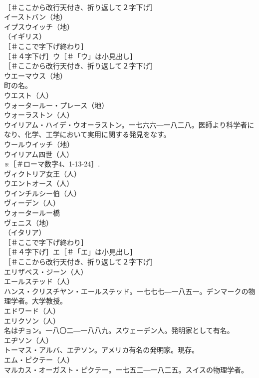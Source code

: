 \documentclass[8pt]{extreport}
\begin{document}
\begin{CJK}{UTF8}{min}
\\	［＃ここから改行天付き、折り返して２字下げ］
\\	イーストバン（地）
\\	イプスウイッチ（地）
\\	（イギリス）
\\	［＃ここで字下げ終わり］
\\	［＃４字下げ］ウ［＃「ウ」は小見出し］
\\	［＃ここから改行天付き、折り返して２字下げ］
\\	ウエーマウス（地）
\\	町の名。
\\	ウエスト（人）
\\	ウォータールー・プレース（地）
\\	ウォーラストン（人）
\\	ウイリアム・ハイデ・ウオーラストン。一七六六―一八二八。医師より科学者になり、化学、工学において実用に関する発見をなす。
\\	ウールウイッチ（地）
\\	ウイリアム四世（人）
\\	※［＃ローマ数字4、1-13-24］.
\\	ヴィクトリア女王（人）
\\	ウエントオース（人）
\\	ウインチルシー伯（人）
\\	ヴィーデン（人）
\\	ウォータールー橋 
\\	ヴェニス（地）
\\	（イタリア）
\\	［＃ここで字下げ終わり］
\\	［＃４字下げ］エ［＃「エ」は小見出し］
\\	［＃ここから改行天付き、折り返して２字下げ］
\\	エリザベス・ジーン（人）
\\	エールステッド（人）
\\	ハンス・クリスチヤン・エールステッド。一七七七―一八五一。デンマークの物理学者。大学教授。
\\	エドワード（人）
\\	エリクソン（人）
\\	名はヂョン。一八〇二―一八八九。スウェーデン人。発明家として有名。
\\	エヂソン（人）
\\	トーマス・アルバ、エヂソン。アメリカ有名の発明家。現存。
\\	エム・ピクテー（人）
\\	マルカス・オーガスト・ピクテー。一七五二―一八二五。スイスの物理学者。

\end{CJK}
\end{document}
